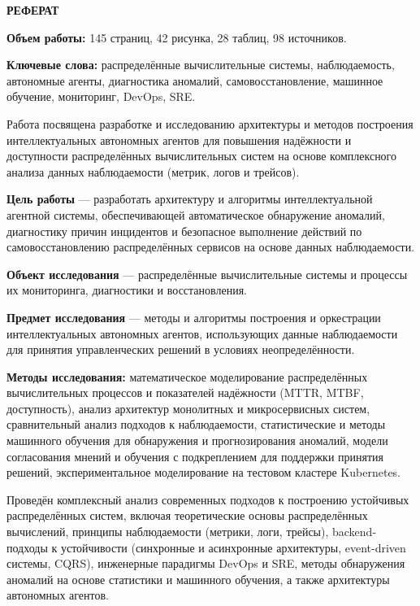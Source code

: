 \begin{center}
    \textbf{РЕФЕРАТ}
\end{center}

\vspace{1cm}

\textbf{Объем работы:} 145 страниц, 42 рисунка, 28 таблиц, 98 источников.

\textbf{Ключевые слова:} распределённые вычислительные системы, наблюдаемость, автономные агенты, диагностика аномалий, самовосстановление, машинное обучение, мониторинг, DevOps, SRE.

\vspace{1cm}

Работа посвящена разработке и исследованию архитектуры и методов построения интеллектуальных автономных агентов для повышения надёжности и доступности распределённых вычислительных систем на основе комплексного анализа данных наблюдаемости (метрик, логов и трейсов).

\textbf{Цель работы} — разработать архитектуру и алгоритмы интеллектуальной агентной системы, обеспечивающей автоматическое обнаружение аномалий, диагностику причин инцидентов и безопасное выполнение действий по самовосстановлению распределённых сервисов на основе данных наблюдаемости.

\textbf{Объект исследования} — распределённые вычислительные системы и процессы их мониторинга, диагностики и восстановления.

\textbf{Предмет исследования} — методы и алгоритмы построения и оркестрации интеллектуальных автономных агентов, использующих данные наблюдаемости для принятия управленческих решений в условиях неопределённости.

\textbf{Методы исследования:} математическое моделирование распределённых вычислительных процессов и показателей надёжности (MTTR, MTBF, доступность), анализ архитектур монолитных и микросервисных систем, сравнительный анализ подходов к наблюдаемости, статистические и методы машинного обучения для обнаружения и прогнозирования аномалий, модели согласования мнений и обучения с подкреплением для поддержки принятия решений, экспериментальное моделирование на тестовом кластере Kubernetes.

Проведён комплексный анализ современных подходов к построению устойчивых распределённых систем, включая теоретические основы распределённых вычислений, принципы наблюдаемости (метрики, логи, трейсы), backend-подходы к устойчивости (синхронные и асинхронные архитектуры, event-driven системы, CQRS), инженерные парадигмы DevOps и SRE, методы обнаружения аномалий на основе статистики и машинного обучения, а также архитектуры автономных агентов.

